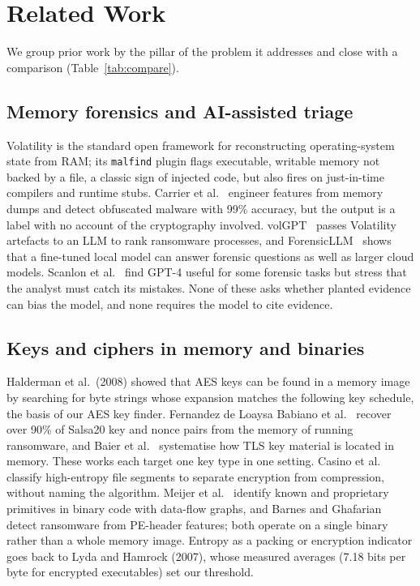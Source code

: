 \section{Related Work}
\label{sec:related}

We group prior work by the pillar of the problem it addresses and close with a comparison
(Table~\ref{tab:compare}).

\subsection{Memory forensics and AI-assisted triage}
Volatility is the standard open framework for reconstructing operating-system state from
RAM; its \texttt{malfind} plugin flags executable, writable memory not backed by a file, a classic sign of
injected code, but also fires on just-in-time compilers and runtime stubs. Carrier et al.~\cite{carrier2022detecting}
engineer features from memory dumps and detect obfuscated malware with 99\% accuracy, but the output is a
label with no account of the cryptography involved. volGPT~\cite{oh2024volgpt} passes Volatility artefacts to
an LLM to rank ransomware processes, and ForensicLLM~\cite{sharma2025forensicllm} shows that a fine-tuned local
model can answer forensic questions as well as larger cloud models. Scanlon et al.~\cite{scanlon2023chatgpt}
find GPT-4 useful for some forensic tasks but stress that the analyst must catch its mistakes. None of these
asks whether planted evidence can bias the model, and none requires the model to cite evidence.

\subsection{Keys and ciphers in memory and binaries}
Halderman et al.\ (2008) showed that AES keys can be found in a memory image by searching for
byte strings whose expansion matches the following key schedule, the basis of our AES key finder.
Fernandez de Loaysa Babiano et al.~\cite{babiano2023evaluation} recover over 90\% of Salsa20 key and nonce
pairs from the memory of running ransomware, and Baier et al.~\cite{baier2024tls} systematise how TLS key
material is located in memory. These works each target one key type in one setting. Casino et
al.~\cite{casino2025not} classify high-entropy file segments to separate encryption from compression, without
naming the algorithm. Meijer et al.~\cite{meijer2021wheres} identify known and proprietary primitives in binary
code with data-flow graphs, and Barnes and Ghafarian~\cite{barnes2026machine} detect ransomware from PE-header
features; both operate on a single binary rather than a whole memory image. Entropy as a packing or
encryption indicator goes back to Lyda and Hamrock (2007), whose measured averages (7.18 bits per
byte for encrypted executables) set our threshold.

